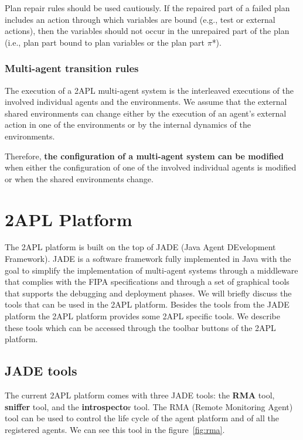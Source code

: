 \documentclass[a4paper]{article}
\begin{document}
Plan repair rules should be used cautiously. If the repaired part of a failed plan includes an action through which variables are bound (e.g., test or external actions), then the variables should not occur in the unrepaired part of the plan (i.e., plan part bound to plan variables or the plan part $\pi$*).


\subsubsection{Multi-agent transition rules}

The execution of a 2APL multi-agent system is the interleaved executions of the involved individual agents and the environments. We assume that the external shared environments can change either by the execution of an agent's external action in one of the environments or by the internal dynamics of the environments.

Therefore, {\bf the configuration of a multi-agent system can be modified} when either the configuration of one of the involved individual agents is modified or when the shared environments change.

\section{2APL Platform}\label{sec:platform} %

The 2APL platform is built on the top of JADE (Java Agent DEvelopment Framework). JADE is a software framework fully implemented in Java with the goal to simplify the implementation of multi-agent systems through a middleware that complies with the FIPA specifications and through a set of graphical tools that supports the debugging and deployment phases. We will briefly discuss the tools that can be used in the 2APL platform. Besides the tools from the JADE platform the 2APL platform provides some 2APL specific tools. We describe these tools which can be accessed through the toolbar buttons of the 2APL platform.

\subsection{JADE tools}

The current 2APL platform comes with three JADE tools: the {\bf RMA} tool, {\bf sniffer} tool, and the
{\bf introspecto}r tool. The RMA (Remote Monitoring Agent) tool can be used to control the life cycle of the agent platform and of all the registered agents. We can see this tool in the figure~\ref{fig:rma}.
\end{document}
